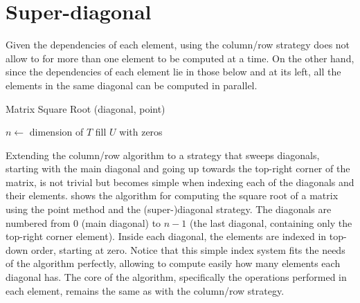 \documentclass[../thesis]{subfiles}
\begin{document}
		\section{Super-diagonal}		

		Given the dependencies of each element, using the column/row strategy does not allow to for more than one element to be computed at a time. On the other hand, since the dependencies of each element lie in those below and at its left, all the elements in the same diagonal can be computed in parallel.

		\begin{algorithm}[htp]
			\caption{Matrix Square Root (diagonal, point)}
			\label{alg:multicore:diagonal:point}
			\DontPrintSemicolon


			$n \leftarrow$ dimension of $T$\;
			fill $U$ with zeros\;

		\end{algorithm}

		Extending the column/row algorithm to a strategy that sweeps diagonals, starting with the main diagonal and going up towards the top-right corner of the matrix, is not trivial but becomes simple when indexing each of the diagonals and their elements.  shows the algorithm for computing the square root of a matrix using the point method and the (super-)diagonal strategy. The diagonals are numbered from $0$ (main diagonal) to $n-1$ (the last diagonal, containing only the top-right corner element). Inside each diagonal, the elements are indexed in top-down order, starting at zero. Notice that this simple index system fits the needs of the algorithm perfectly, allowing to compute easily how many elements each diagonal has. The core of the algorithm, specifically the operations performed in each element, remains the same as with the column/row strategy.
\end{document}
